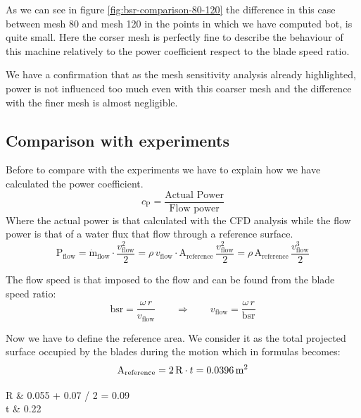 \documentclass[a4paper,12pt]{article}
\begin{document}
As we can see in figure \ref{fig:bsr-comparison-80-120} the difference in this case between mesh 80 and mesh 120 in the points in which we have computed bot, is quite small.
Here the corser mesh is perfectly fine to describe the behaviour of this machine relatively to the power coefficient respect to the blade speed ratio.

We have a confirmation that as the mesh sensitivity analysis already highlighted, power is not influenced too much even with this coarser mesh and the difference with the finer mesh is almost negligible.

\subsection{Comparison with experiments}

Before to compare with the experiments we have to explain how we have calculated the power coefficient.
\begin{equation}
c_\text{P} = \dfrac{\text{Actual Power}}{\text{Flow power}}
\end{equation}
Where the actual power is that calculated with the CFD analysis while the flow power is that of a water flux that flow through a reference surface. 
\begin{equation}
\text{P}_\text{flow} 
= \dot{\text{m}}_\text{flow} \cdot \dfrac{v^2_\text{flow}}{2} 
= \rho \, v_\text{flow} \cdot \text{A}_\text{reference} \, \dfrac{v^2_\text{flow}}{2} 
= \rho \, \text{A}_\text{reference} \, \dfrac{v^3_\text{flow}}{2}
\end{equation}

The flow speed is that imposed to the flow and can be found from the blade speed ratio:
\begin{equation}
\text{bsr} = \dfrac{\omega \, r}{v_\text{flow}} \quad \quad \Rightarrow \quad \quad v_\text{flow} = \dfrac{\omega \, r}{\text{bsr} }
\end{equation}

Now we have to define the reference area. We consider it as the total projected surface occupied by the blades during the motion which in formulas becomes:
\begin{equation}
\text{A}_\text{reference} = 2\, \text{R} \cdot t = 0.0396 \,\text{m}^2
\end{equation}
\begin{conditions}
R & 0.055 + 0.07 / 2 = 0.09 \m  {} \\
t & 0.22 \m {}
\end{conditions}
\end{document}
